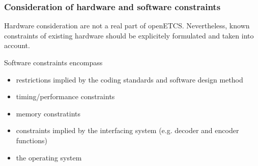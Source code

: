 \subsubsection{Consideration of hardware and software constraints}



Hardware consideration are not a real part of openETCS.
Nevertheless, known constraints of existing hardware should be explicitely
formulated and taken into account.

\noindent 
Software constraints encompass 

\begin{itemize}
   \item restrictions implied by the coding standards and software design method
   \item timing\slash performance constraints
   \item memory constratints 
   \item constraints implied by 
         the interfacing system (e.g. decoder and encoder functions)
   \item the operating system
\end{itemize}


